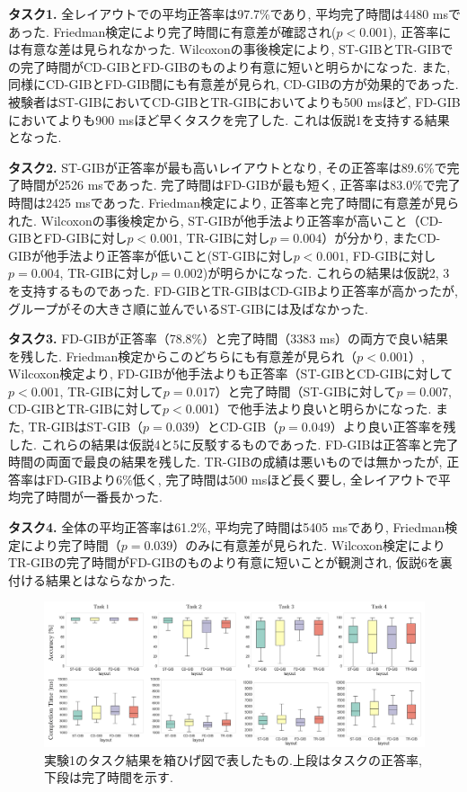 \documentclass{kuee}
\begin{document}
{\bf タスク1.} 全レイアウトでの平均正答率は97.7\%であり, 平均完了時間は4480 msであった.
Friedman検定により完了時間に有意差が確認され($p < 0.001$), 正答率には有意な差は見られなかった.
Wilcoxonの事後検定により, ST-GIBとTR-GIBでの完了時間がCD-GIBとFD-GIBのものより有意に短いと明らかになった.
また, 同様にCD-GIBとFD-GIB間にも有意差が見られ, CD-GIBの方が効果的であった.
被験者はST-GIBにおいてCD-GIBとTR-GIBにおいてよりも500 msほど, FD-GIBにおいてよりも900 msほど早くタスクを完了した.
これは仮説1を支持する結果となった.

{\bf タスク2.} ST-GIBが正答率が最も高いレイアウトとなり, その正答率は89.6\%で完了時間が2526 msであった.
完了時間はFD-GIBが最も短く, 正答率は83.0\%で完了時間は2425 msであった.
Friedman検定により, 正答率と完了時間に有意差が見られた.
Wilcoxonの事後検定から, ST-GIBが他手法より正答率が高いこと（CD-GIBとFD-GIBに対し$p<0.001$, TR-GIBに対し$p=0.004$）が分かり, またCD-GIBが他手法より正答率が低いこと(ST-GIBに対し$p<0.001$, FD-GIBに対し$p=0.004$, TR-GIBに対し$p=0.002$)が明らかになった.
これらの結果は仮説2, 3を支持するものであった.
FD-GIBとTR-GIBはCD-GIBより正答率が高かったが, グループがその大きさ順に並んでいるST-GIBには及ばなかった.

{\bf タスク3.} FD-GIBが正答率（78.8\%）と完了時間（3383 ms）の両方で良い結果を残した.
Friedman検定からこのどちらにも有意差が見られ（$p<0.001$）, Wilcoxon検定より, FD-GIBが他手法よりも正答率（ST-GIBとCD-GIBに対して$p<0.001$, TR-GIBに対して$p=0.017$）と完了時間（ST-GIBに対して$p=0.007$, CD-GIBとTR-GIBに対して$p<0.001$）で他手法より良いと明らかになった.
また, TR-GIBはST-GIB（$p=0.039$）とCD-GIB（$p=0.049$）より良い正答率を残した.
これらの結果は仮説4と5に反駁するものであった.
FD-GIBは正答率と完了時間の両面で最良の結果を残した.
TR-GIBの成績は悪いものでは無かったが, 正答率はFD-GIBより6\%低く, 完了時間は500 msほど長く要し, 全レイアウトで平均完了時間が一番長かった.

{\bf タスク4.} 全体の平均正答率は61.2\%, 平均完了時間は5405 msであり, Friedman検定により完了時間（$p=0.039$）のみに有意差が見られた.
Wilcoxon検定によりTR-GIBの完了時間がFD-GIBのものより有意に短いことが観測され, 仮説6を裏付ける結果とはならなかった.


\begin{figure}
  \centering
  \includegraphics[width=15cm]{./images/8sta.png}
  \caption{実験1のタスク結果を箱ひげ図で表したもの.上段はタスクの正答率, 下段は完了時間を示す.\label{fig:result_ex1}}
\end{figure}
\end{document}
